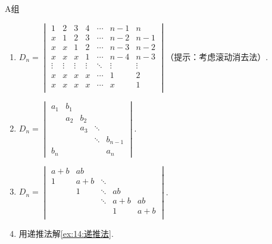 \centerline{\heiti A组}
\begin{enumerate}
    \item $ D_n=\begin{vmatrix}
                  1      & 2      & 3      & 4      & \cdots & n-1    & n      \\
                  x      & 1      & 2      & 3      & \cdots & n-2    & n-1    \\
                  x      & x      & 1      & 2      & \cdots & n-3    & n-2    \\
                  x      & x      & x      & 1      & \cdots & n-4    & n-3    \\
                  \vdots & \vdots & \vdots & \vdots & \ddots & \vdots & \vdots \\
                  x      & x      & x      & x      & \cdots & 1      & 2      \\
                  x      & x      & x      & x      & \cdots & x      & 1      \\
              \end{vmatrix}$（提示：考虑滚动消去法）.

    \item $ D_n=\begin{vmatrix}
                  a_1 & b_1 &     &        &         \\
                      & a_2 & b_2 &        &         \\
                      &     & a_3 & \ddots &         \\
                      &     &     & \ddots & b_{n-1} \\
                  b_n &     &     &        & a_n
              \end{vmatrix}$.

    \item $D_n=\begin{vmatrix}
                  a+b & ab  &        &     &     \\
                  1   & a+b & \ddots &     &     \\
                      & 1   & \ddots & ab  &     \\
                      &     & \ddots & a+b & ab  \\
                      &     &        & 1   & a+b \\
              \end{vmatrix}$.

    \item 用递推法解\autoref{ex:14:递推法}.


\end{enumerate}
